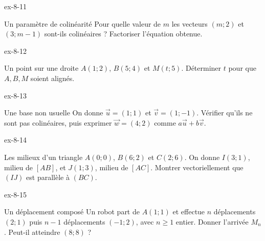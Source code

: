 \clearpage{}
\begin{blocLivre}{ex-8-11}
\begin{exercice}[3]{Un paramètre de colinéarité}
Pour quelle valeur de $m$ les vecteurs $(m;2)$ et $(3;m-1)$ sont-ils colinéaires ? Factoriser l’équation obtenue.
\label{fig-ex-8-11}
\end{exercice}
\end{blocLivre}
\begin{blocLivre}{ex-8-12}
\begin{exercice}[3]{Un point sur une droite}
$A(1;2)$, $B(5;4)$ et $M(t;5)$. Déterminer $t$ pour que $A,B,M$ soient alignés.
\label{fig-ex-8-12}
\end{exercice}
\end{blocLivre}
\begin{blocLivre}{ex-8-13}
\begin{exercice}[3]{Une base non usuelle}
On donne $\vec u=(1;1)$ et $\vec v=(1;-1)$. Vérifier qu’ils ne sont pas colinéaires, puis exprimer $\vec w=(4;2)$ comme $a\vec u+b\vec v$.
\label{fig-ex-8-13}
\end{exercice}
\end{blocLivre}
\begin{blocLivre}{ex-8-14}
\begin{exercice}[3]{Les milieux d’un triangle}
$A(0;0)$, $B(6;2)$ et $C(2;6)$. On donne $I(3;1)$, milieu de $[AB]$, et $J(1;3)$, milieu de $[AC]$. Montrer vectoriellement que $(IJ)$ est parallèle à $(BC)$.
\label{fig-ex-8-14}
\end{exercice}
\end{blocLivre}
\begin{blocLivre}{ex-8-15}
\begin{exercice}[3]{Un déplacement composé}
Un robot part de $A(1;1)$ et effectue $n$ déplacements $(2;1)$ puis $n-1$ déplacements $(-1;2)$, avec $n\ge1$ entier. Donner l’arrivée $M_n$. Peut-il atteindre $(8;8)$ ?
\label{fig-ex-8-15}
\end{exercice}
\end{blocLivre}

\clearpage

